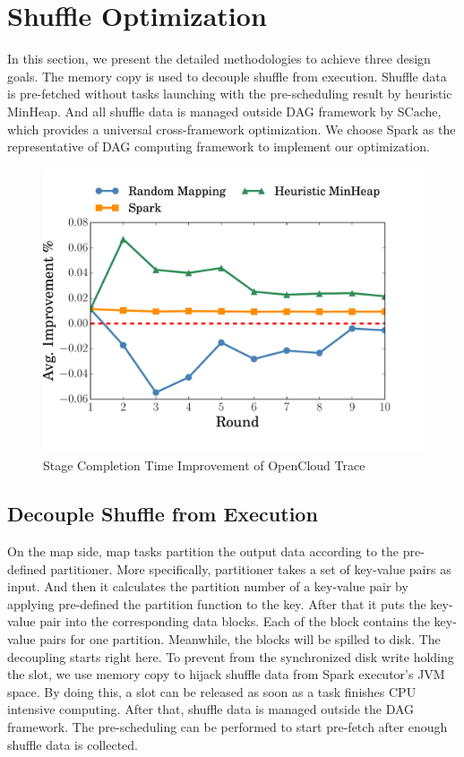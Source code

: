 \section{Shuffle Optimization}
In this section, we present the detailed methodologies to achieve three design goals. The memory copy is used to decouple shuffle from execution. Shuffle data is pre-fetched without tasks launching with the pre-scheduling result by heuristic MinHeap. And all shuffle data is managed outside DAG framework by SCache, which provides a universal cross-framework optimization.
We choose Spark as the representative of DAG computing framework to implement our optimization.

\begin{figure}
	\centering
	\includegraphics[width=0.9\linewidth]{fig/sim}
	\caption{Stage Completion Time Improvement of OpenCloud Trace}
	\label{fig:sim}
\end{figure}

\subsection{Decouple Shuffle from Execution}
On the map side, map tasks partition the output data according to the pre-defined partitioner. More specifically, partitioner takes a set of key-value pairs as input. And then it calculates the partition number of a key-value pair by applying pre-defined the partition function to the key. After that it puts the key-value pair into the corresponding data blocks. Each of the block contains the key-value pairs for one partition. Meanwhile, the blocks will be spilled to disk. The decoupling starts right here. To prevent from the synchronized disk write holding the slot, we use memory copy to hijack shuffle data from Spark executor's JVM space. By doing this, a slot can be released as soon as a task finishes CPU intensive computing. After that, shuffle data is managed outside the DAG framework. The pre-scheduling can be performed to start pre-fetch after enough shuffle data is collected.

